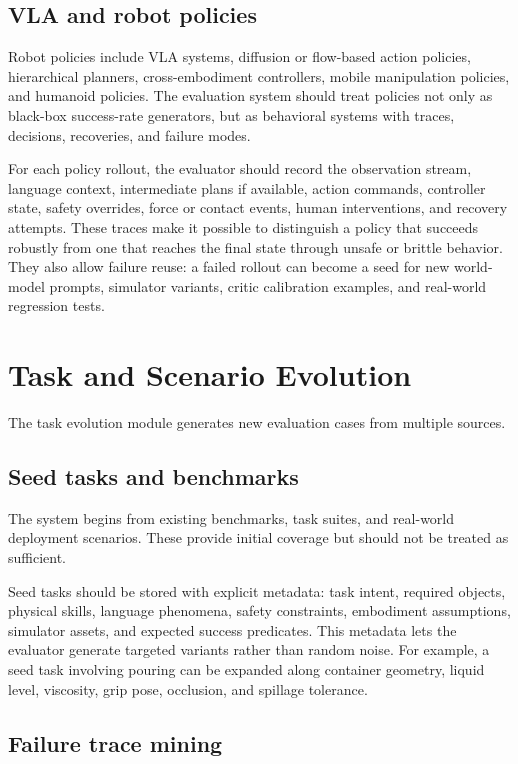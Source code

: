 \documentclass[sigconf,review,anonymous]{acmart}
\begin{document}
\subsection{VLA and robot policies}

Robot policies include VLA systems, diffusion or flow-based action policies, hierarchical planners, cross-embodiment controllers, mobile manipulation policies, and humanoid policies. The evaluation system should treat policies not only as black-box success-rate generators, but as behavioral systems with traces, decisions, recoveries, and failure modes.

For each policy rollout, the evaluator should record the observation stream, language context, intermediate plans if available, action commands, controller state, safety overrides, force or contact events, human interventions, and recovery attempts. These traces make it possible to distinguish a policy that succeeds robustly from one that reaches the final state through unsafe or brittle behavior. They also allow failure reuse: a failed rollout can become a seed for new world-model prompts, simulator variants, critic calibration examples, and real-world regression tests.

\section{Task and Scenario Evolution}

The task evolution module generates new evaluation cases from multiple sources.

\subsection{Seed tasks and benchmarks}

The system begins from existing benchmarks, task suites, and real-world deployment scenarios. These provide initial coverage but should not be treated as sufficient.

Seed tasks should be stored with explicit metadata: task intent, required objects, physical skills, language phenomena, safety constraints, embodiment assumptions, simulator assets, and expected success predicates. This metadata lets the evaluator generate targeted variants rather than random noise. For example, a seed task involving pouring can be expanded along container geometry, liquid level, viscosity, grip pose, occlusion, and spillage tolerance.

\subsection{Failure trace mining}
\end{document}
